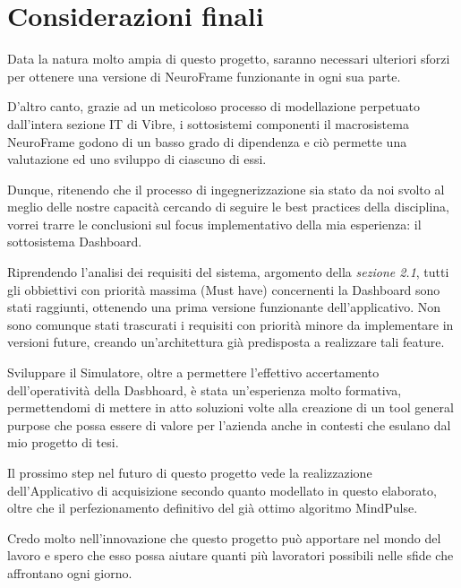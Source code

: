 \chapter*{Considerazioni finali}
Data la natura molto ampia di questo progetto, saranno necessari ulteriori sforzi per ottenere una versione di NeuroFrame funzionante in ogni sua parte.\newline

\noindent D'altro canto, grazie ad un meticoloso processo di modellazione perpetuato dall'intera sezione IT di Vibre, i sottosistemi componenti il macrosistema NeuroFrame godono di un basso grado di dipendenza e ciò permette una valutazione ed uno sviluppo di ciascuno di essi.\newline

\noindent Dunque, ritenendo che il processo di ingegnerizzazione sia stato da noi svolto al meglio delle nostre capacità cercando di seguire le best practices della disciplina, vorrei trarre le conclusioni sul focus implementativo della mia esperienza: il sottosistema Dashboard.\newline

\noindent Riprendendo l'analisi dei requisiti del sistema, argomento della \emph{sezione 2.1}, tutti gli obbiettivi con priorità massima (Must have) concernenti la Dashboard sono stati raggiunti, ottenendo una prima versione funzionante dell'applicativo.\newline
Non sono comunque stati trascurati i requisiti con priorità minore da implementare in versioni future, creando un'architettura già predisposta a realizzare tali feature.\newline

\noindent Sviluppare il Simulatore, oltre a permettere l'effettivo accertamento dell'operatività della Dasbhoard, è stata un'esperienza molto formativa, permettendomi di mettere in atto soluzioni volte alla creazione di un tool general purpose che possa essere di valore per l'azienda anche in contesti che esulano dal mio progetto di tesi.\newline

\noindent Il prossimo step nel futuro di questo progetto vede la realizzazione dell'Applicativo di acquisizione secondo quanto modellato in questo elaborato, oltre che il perfezionamento definitivo del già ottimo algoritmo MindPulse.\newline

\noindent Credo molto nell'innovazione che questo progetto può apportare nel mondo del lavoro e spero che esso possa aiutare quanti più lavoratori possibili nelle sfide che affrontano ogni giorno.